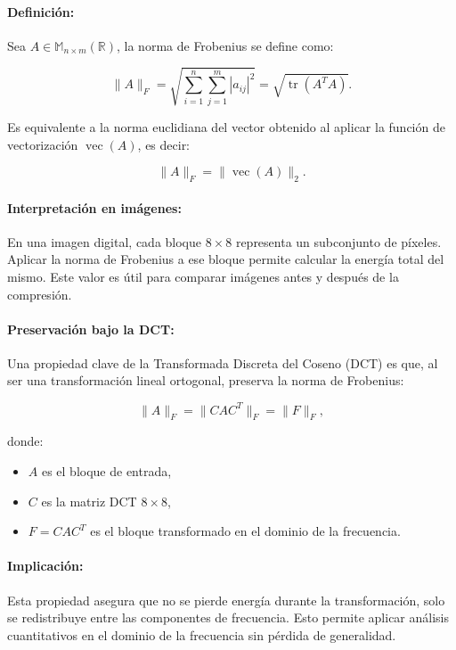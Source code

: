 \documentclass[8pt,a4paper]{article}
\theoremstyle{definition}
\theoremstyle{remark}
\begin{document}
\begin{multicols}{2}
            \paragraph{Definición:} Sea \( A \in \mathbb{M}_{n \times m}(\mathbb{R}) \), la norma de Frobenius se define como:
            
            \[
            \|A\|_F = \sqrt{ \sum_{i=1}^{n} \sum_{j=1}^{m} |a_{ij}|^2 } = \sqrt{\operatorname{tr}(A^T A)}.
            \]
            
            Es equivalente a la norma euclidiana del vector obtenido al aplicar la función de vectorización \( \operatorname{vec}(A) \), es decir:
            
            \[
            \|A\|_F = \|\operatorname{vec}(A)\|_2.
            \]
            
            \paragraph{Interpretación en imágenes:} En una imagen digital, cada bloque \( 8 \times 8 \) representa un subconjunto de píxeles. Aplicar la norma de Frobenius a ese bloque permite calcular la energía total del mismo. Este valor es útil para comparar imágenes antes y después de la compresión.
            
            \paragraph{Preservación bajo la DCT:} Una propiedad clave de la Transformada Discreta del Coseno (DCT) es que, al ser una transformación lineal ortogonal, preserva la norma de Frobenius:
            
            \[
            \|A\|_F = \|CAC^T\|_F = \|F\|_F,
            \]
            
            donde:
            \begin{itemize}
                \item \( A \) es el bloque de entrada,
                \item \( C \) es la matriz DCT \( 8 \times 8 \),
                \item \( F = CAC^T \) es el bloque transformado en el dominio de la frecuencia.
            \end{itemize}
            
            \paragraph{Implicación:} Esta propiedad asegura que no se pierde energía durante la transformación, solo se redistribuye entre las componentes de frecuencia. Esto permite aplicar análisis cuantitativos en el dominio de la frecuencia sin pérdida de generalidad.


\end{multicols}
\end{document}
